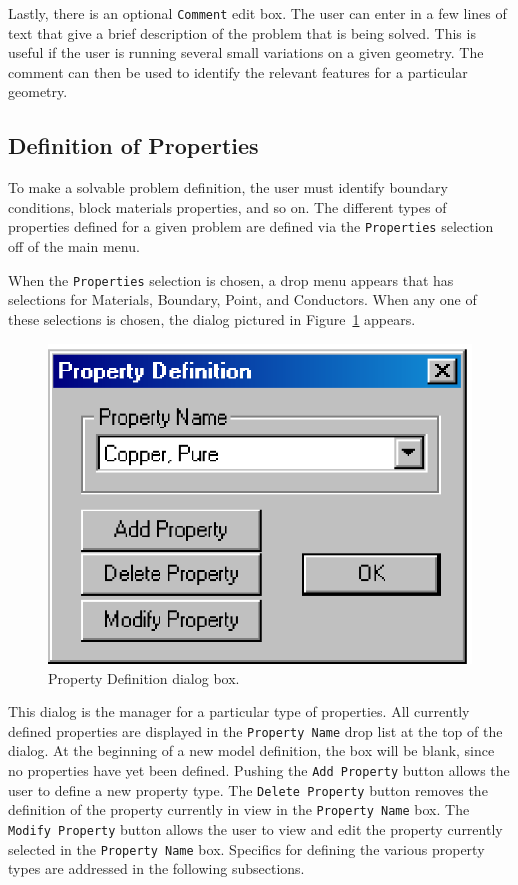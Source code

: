 Lastly, there is an optional \texttt{Comment} edit box. The user
can enter in a few lines of text that give a brief description of
the problem that is being solved. This is useful if the user is
running several small variations on a given geometry. The comment
can then be used to identify the relevant features for a particular
geometry.

\subsection{Definition of Properties}

To make a solvable problem definition, the user must identify boundary
conditions, block materials properties, and so on. The different types of
properties defined for a given problem are defined via the
\texttt{Properties} selection off of the main menu.

When the \texttt{Properties} selection is chosen, a drop menu
appears that has selections for Materials, Boundary, Point, and
Conductors. When any one of these selections is chosen, the dialog
pictured in Figure~\ref{cfig7} appears.

\begin{figure}[htbp]
\centerline{\includegraphics{hpropdef.ps}}
\caption{Property Definition dialog box.}
\label{cfig7}
\end{figure}

This dialog is the manager for a particular type of properties. All
currently defined properties are displayed in the \texttt{Property
Name} drop list at the top of the dialog. At the beginning of a new
model definition, the box will be blank, since no properties have
yet been defined. Pushing the \texttt{Add Property} button allows
the user to define a new property type. The \texttt{Delete
Property} button removes the definition of the property currently
in view in the \texttt{Property Name} box. The \texttt{Modify
Property} button allows the user to view and edit the property
currently selected in the \texttt{Property Name} box. Specifics for
defining the various property types are addressed in the
following subsections.

